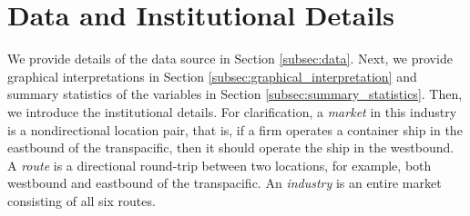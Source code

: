 \documentclass[11pt]{article}
\begin{document}
\section{Data and Institutional Details}\label{sec:data}

We provide details of the data source in Section \ref{subsec:data}. Next, we provide graphical interpretations in Section \ref{subsec:graphical_interpretation} and summary statistics of the variables in Section \ref{subsec:summary_statistics}. Then, we introduce the institutional details. For clarification, a \textit{market} in this industry is a nondirectional location pair, that is, if a firm operates a container ship in the eastbound of the transpacific, then it should operate the ship in the westbound. A \textit{route} is a directional round-trip between two locations, for example, both westbound and eastbound of the transpacific. An \textit{industry} is an entire market consisting of all six routes.
\end{document}
